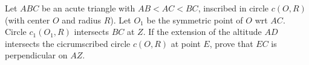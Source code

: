 Let $ABC$ be an acute triangle with $AB<AC<BC$, inscribed in circle $c(O,R)$ (with center $O$ and radius $R$). Let $O_1$ be the symmetric point of $O$ wrt $AC$. Circle $c_1(O_1,R)$ intersects $BC$ at $Z$. If the extension of the altitude $AD$ intersects  the cicrumscribed circle  $c(O,R)$ at point $E$, prove that $EC$ is perpendicular on $AZ$.